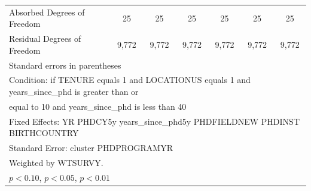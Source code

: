 \begin{table}[htbp]
\begin{tabular}{l*{6}{c}}
Absorbed Degrees of Freedom&          25         &          25         &          25         &          25         &          25         &          25         \\
Residual Degrees of Freedom&       9,772         &       9,772         &       9,772         &       9,772         &       9,772         &       9,772         \\
\hline\hline
\multicolumn{7}{l}{\footnotesize Standard errors in parentheses}\\
\multicolumn{7}{l}{\footnotesize Condition: if TENURE equals 1 and LOCATIONUS equals 1 and years\_since\_phd is greater than or}\\
\multicolumn{7}{l}{\footnotesize equal to 10 and years\_since\_phd is less than 40}\\
\multicolumn{7}{l}{\footnotesize Fixed Effects: YR PHDCY5y years\_since\_phd5y PHDFIELDNEW PHDINST BIRTHCOUNTRY}\\
\multicolumn{7}{l}{\footnotesize Standard Error: cluster PHDPROGRAMYR}\\
\multicolumn{7}{l}{\footnotesize Weighted by WTSURVY.}\\
\multicolumn{7}{l}{\footnotesize \sym{*} \(p<0.10\), \sym{**} \(p<0.05\), \sym{***} \(p<0.01\)}\\
\end{tabular}
\end{table}
